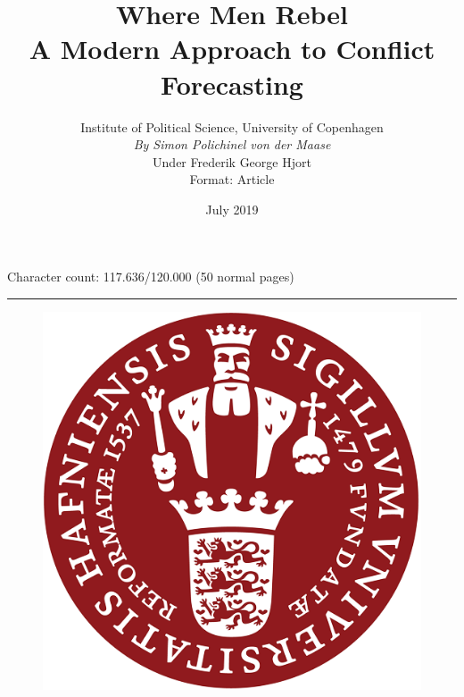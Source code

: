 \documentclass[a4paper]{article}
\title{Where Men Rebel\\A Modern Approach to Conflict Forecasting}
\author{Institute of Political Science, University of Copenhagen\\\emph{By Simon Polichinel von der Maase}\\Under Frederik George Hjort\\\footnotesize{Format: Article}}
\date{July 2019}
\begin{document}
	\begin{titlepage}
		\maketitle
		Character count: 117.636/120.000 (50 normal pages)\\
		\noindent\rule{\linewidth}{0.4pt}
		\begin{figure}[h]
			\centering
			\includegraphics[scale=0.32]{KU_logo.png}
		\end{figure}
		\thispagestyle{empty} %
	\end{titlepage}
    \tableofcontents
\pagebreak
\end{document}
